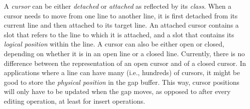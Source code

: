 A \emph{cursor} can be either \emph{detached} or \emph{attached} as
reflected by its \emph{class}.  When a cursor needs to move from one
line to another line, it is first detached from its current line and
then attached to its target line.  An attached cursor contains a slot
that refers to the line to which it is attached, and a slot that
contains its \emph{logical position} within the line.  A cursor can
also be either open or closed, depending on whether it is in an open
line or a closed line.  Currently, there is no difference between the
representation of an open cursor and of a closed cursor.  In
applications where a line can have many (i.e., hundreds) of cursors,
it might be good to store the \emph{physical position} in the gap
buffer.  This way, cursor positions will only have to be updated when
the gap moves, as opposed to after every editing operation, at least
for insert operations.  
